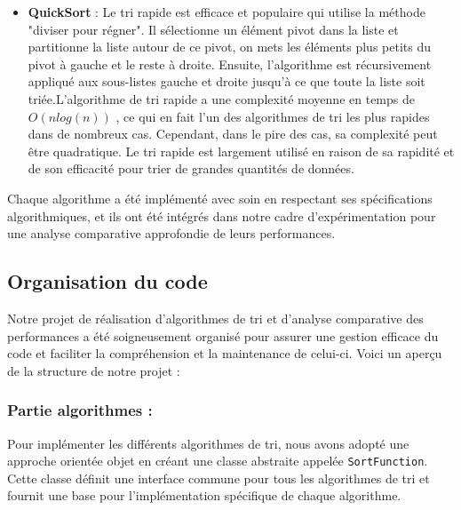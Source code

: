 \documentclass[a4paper,12pt]{article}
\begin{document}
\begin{itemize}
\item \textbf{QuickSort} : Le tri rapide est efficace et populaire qui utilise la méthode "diviser pour régner". Il sélectionne un élément pivot dans la liste et partitionne la liste autour de ce pivot, on mets les éléments plus petits du pivot à gauche et le reste à droite. Ensuite, l'algorithme est récursivement appliqué aux sous-listes gauche et droite jusqu'à ce que toute la liste soit triée.L'algorithme de tri rapide a une complexité moyenne en temps de $O(n log (n))$ , ce qui en fait l'un des algorithmes de tri les plus rapides dans de nombreux cas. Cependant, dans le pire des cas, sa complexité peut être quadratique. Le tri rapide est largement utilisé en raison de sa rapidité et de son efficacité pour trier de grandes quantités de données.\\
\end{itemize}

Chaque algorithme a été implémenté avec soin en respectant ses spécifications algorithmiques, et ils ont été intégrés dans notre cadre d'expérimentation pour une analyse comparative approfondie de leurs performances.

\subsection{Organisation du code}

Notre projet de réalisation d'algorithmes de tri et d'analyse comparative des performances a été soigneusement organisé pour assurer une gestion efficace du code et faciliter la compréhension et la maintenance de celui-ci. Voici un aperçu de la structure de notre projet :


\subsubsection{Partie algorithmes :}

Pour implémenter les différents algorithmes de tri, nous avons adopté une approche orientée objet en créant une classe abstraite appelée \texttt{SortFunction}. Cette classe définit une interface commune pour tous les algorithmes de tri et fournit une base pour l'implémentation spécifique de chaque algorithme.
\end{document}

